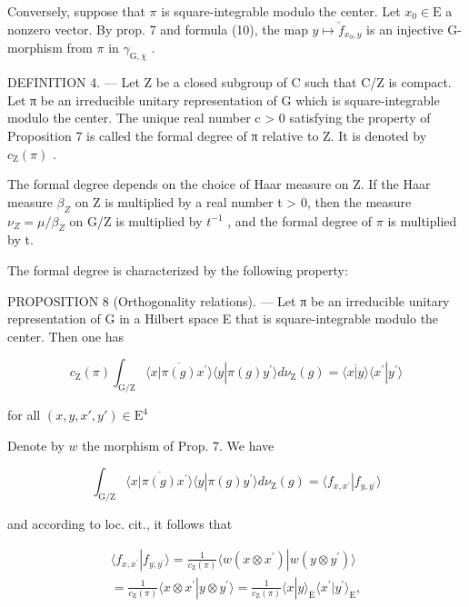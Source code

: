 Conversely, suppose that \(\pi\) is square-integrable modulo the center. Let \(x_0 \in \mathrm{E}\) a nonzero vector. By prop. 7 and formula (10), the map \(y \mapsto \check{f}_{x_0,y}\) is an injective G-morphism from \(\pi\) in \(\gamma_{\mathrm{G},\overline{\chi}}\) .

DEFINITION 4. --- Let Z be a closed subgroup of C such that C/Z is compact. Let π be an irreducible unitary representation of G which is square-integrable modulo the center. The unique real number c \textgreater{} 0 satisfying the property of Proposition 7 is called the formal degree of π relative to Z. It is denoted by \(c_{\mathrm{Z}}(\pi)\) .

The formal degree depends on the choice of Haar measure on Z. If the Haar measure \(\beta_{Z}\) on Z is multiplied by a real number t \textgreater{} 0, then the measure \(\nu_{Z} = \mu/\beta_{Z}\) on G/Z is multiplied by \(t^{-1}\) , and the formal degree of \(\pi\) is multiplied by t.

The formal degree is characterized by the following property:

PROPOSITION 8 (Orthogonality relations). --- Let π be an irreducible unitary representation of G in a Hilbert space E that is square-integrable modulo the center. Then one has

\[
c _ {\mathrm{Z}} (\pi) \int_ {\mathrm{G} / \mathrm{Z}} \overline {{\langle x | \pi (g) x ^ {\prime} \rangle}} \langle y | \pi (g) y ^ {\prime} \rangle d \nu_ {\mathrm{Z}} (g) = \overline {{\langle x | y \rangle}} \langle x ^ {\prime} | y ^ {\prime} \rangle
\]

for all \((x,y,x',y')\in \mathrm{E}^4\)

Denote by \(w\) the morphism of Prop. 7. We have

\[
\int_ {\mathrm{G} / \mathrm{Z}} \overline {{\langle x | \pi (g) x ^ {\prime} \rangle}} \langle y | \pi (g) y ^ {\prime} \rangle d \nu_ {\mathrm{Z}} (g) = \langle f _ {x, x ^ {\prime}} | f _ {y, y ^ {\prime}} \rangle
\]

and according to loc. cit., it follows that

\[
\begin{array}{c} \langle f _ {x, x ^ {\prime}} | f _ {y, y ^ {\prime}} \rangle = \frac {1}{c _ {\mathrm{Z}} (\pi)} \langle w (x \otimes x ^ {\prime}) | w (y \otimes y ^ {\prime}) \rangle \\ = \frac {1}{c _ {\mathrm{Z}} (\pi)} \langle x \otimes x ^ {\prime} | y \otimes y ^ {\prime} \rangle = \frac {1}{c _ {\mathrm{Z}} (\pi)} \langle x | y \rangle_ {\overline {{\mathrm{E}}}} \langle x ^ {\prime} | y ^ {\prime} \rangle_ {\mathrm{E}}, \end{array}
\]

